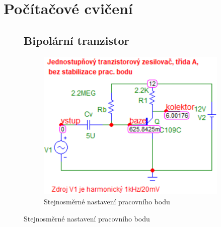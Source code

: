 \documentclass{article}
\begin{document}
\section{Počítačové cvičení}
\begin{figure}[H]
  \begin{minipage}[t]{0.5\textwidth}
    \subsection{Bipolární tranzistor}
  \end{minipage}
  \begin{minipage}[t]{0.5\textwidth}
    \vspace{-15mm}
    \begin{figure}[H]
      \includegraphics[width=\textwidth]{PC/BJT/prac_bod.png}
      \caption{\label{prac_bod} Stejnosměrné nastavení pracovního bodu}
    \end{figure}
  \end{minipage}
  

\end{figure}
\end{document}
